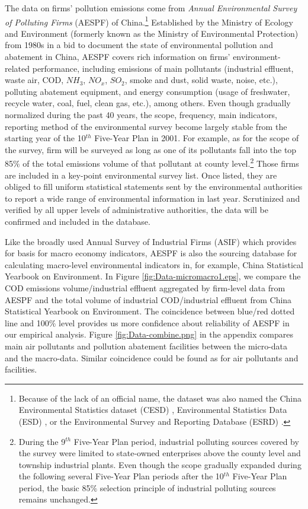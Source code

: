 \documentclass[12pt,english]{article}
\begin{document}
The data on firms' pollution emissions come from \textit{Annual Environmental Survey of Polluting Firms} (AESPF) of China.\footnote{Because of the lack of an official name, the dataset was also named the China Environmental Statistics dataset (CESD) \citep*{zhang2018does}, Environmental Statistics Data (ESD) \citep*{wu2017westward}, or the Environmental Survey and Reporting Database (ESRD) \citep*{he2018environmental}.} Established by the Ministry of Ecology and Environment (formerly known as the Ministry of Environmental Protection) from 1980s in a bid to document the state of environmental pollution and abatement in China, AESPF covers rich information on firms' environment-related performance, including emissions of main pollutants (industrial effluent, waste air, COD, $NH_{3}$, $NO_{x}$, $SO_{2}$, smoke and dust, solid waste, noise, etc.), polluting abatement equipment, and energy consumption (usage of freshwater, recycle water, coal, fuel, clean gas, etc.), among others. %
Even though gradually normalized during the past 40 years, the scope, frequency, main indicators, reporting method of the environmental survey become largely stable from the starting year of the 10$^{th}$ Five-Year Plan in 2001. For example, as for the scope of the survey, firm will be surveyed as long as one of its pollutants fall into the top 85$\%$ of the total emissions volume of that pollutant at county level.\footnote{During the 9$^{th}$ Five-Year Plan period, industrial polluting sources covered by the survey were limited to state-owned enterprises above the county level and township industrial plants. Even though the scope gradually expanded during the following several Five-Year Plan periods after the 10$^{th}$ Five-Year Plan period, the basic 85$\%$ selection principle of industrial polluting sources remains unchanged.} Those firms are included in a key-point environmental survey list. Once listed, they are obliged to fill uniform statistical statements sent by the environmental authorities to report a wide range of environmental information in last year. Scrutinized and verified by all upper levels of administrative authorities, the data will be confirmed and included in the database.

Like the broadly used Annual Survey of Industrial Firms (ASIF) which provides for basis for macro economy indicators, AESPF is also the sourcing database for calculating macro-level environmental indicators in, for example, China Statistical Yearbook on Environment. In Figure \ref{fig:Data-micromacro1.eps}, we compare the COD emissions volume/industrial effluent aggregated by firm-level data from AESPF and the total volume of industrial COD/industrial effluent from China Statistical Yearbook on Environment. The coincidence between blue/red dotted line and 100$\%$ level provides us more confidence about reliability of AESPF in our empirical analysis. Figure \ref{fig:Data-combine.png} in the appendix compares main air pollutants and pollution abatement facilities between the micro-data and the macro-data. Similar coincidence could be found as for air pollutants and facilities.
\end{document}
